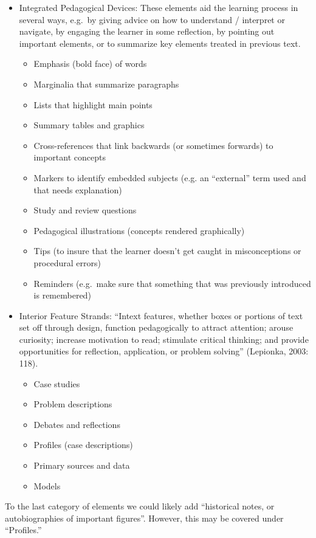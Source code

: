 \documentclass[12pt]{article}
\begin{document}
\begin{itemize}
\begin{itemize}
  \end{itemize}
\item Integrated Pedagogical Devices: These elements aid the learning process in
  several ways, e.g.\ by giving advice on how to understand / interpret or
  navigate, by engaging the learner in some reflection, by pointing out
  important elements, or to summarize key elements treated in previous text.
  \begin{itemize}
  \item Emphasis (bold face) of words
  \item Marginalia that summarize paragraphs
  \item Lists that highlight main points
  \item Summary tables and graphics
  \item Cross-references that link backwards (or sometimes forwards) to important
    concepts
  \item Markers to identify embedded subjects (e.g. an ``external'' term used
    and that needs explanation)
  \item Study and review questions
  \item Pedagogical illustrations (concepts rendered graphically)
  \item Tips (to insure that the learner doesn't get caught in misconceptions or
    procedural errors)
  \item Reminders (e.g.\ make sure that something that was previously introduced
    is remembered)
  \end{itemize}
\item Interior Feature Strands: ``Intext features, whether boxes or portions of
  text set off through design, function pedagogically to attract attention;
  arouse curiosity; increase motivation to read; stimulate critical thinking; and
  provide opportunities for reflection, application, or problem solving''
  (Lepionka, 2003: 118).
  \begin{itemize}
  \item Case studies
  \item Problem descriptions
  \item Debates and reflections
  \item Profiles (case descriptions)
  \item Primary sources and data
  \item Models
  \end{itemize}
\end{itemize}

To the last category of elements we could likely add ``historical notes, or
autobiographies of important figures''.  However, this may be covered under
``Profiles.''
\end{document}
